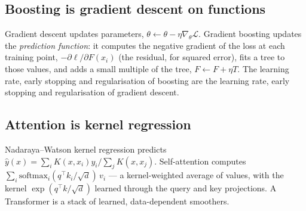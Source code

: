 \documentclass[11pt]{article}
\begin{document}
\subsection{Boosting is gradient descent on functions}
Gradient descent updates parameters, $\theta\leftarrow\theta-\eta\nabla_\theta\mathcal L$. Gradient boosting updates the \emph{prediction function}: it computes the negative gradient of the loss at each training point, $-\partial\ell/\partial F(x_i)$ (the residual, for squared error), fits a tree to those values, and adds a small multiple of the tree, $F\leftarrow F+\eta T$. The learning rate, early stopping and regularisation of boosting are the learning rate, early stopping and regularisation of gradient descent.

\subsection{Attention is kernel regression}
Nadaraya--Watson kernel regression predicts $\hat y(x)=\sum_iK(x,x_i)y_i/\sum_jK(x,x_j)$. Self-attention computes $\sum_i\text{softmax}_i(q^\top k_i/\sqrt d)\,v_i$ --- a kernel-weighted average of values, with the kernel $\exp(q^\top k/\sqrt d)$ learned through the query and key projections. A Transformer is a stack of learned, data-dependent smoothers.
\end{document}
